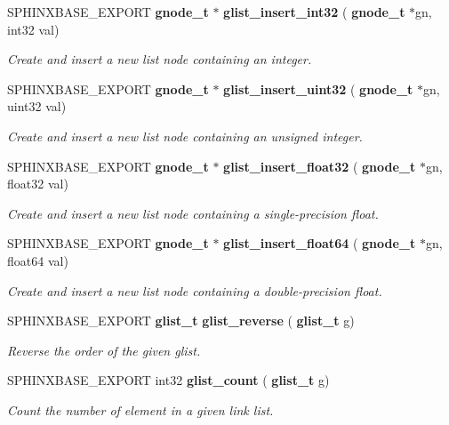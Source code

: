 \begin{DoxyCompactItemize}
S\+P\+H\+I\+N\+X\+B\+A\+S\+E\+\_\+\+E\+X\+P\+O\+RT \textbf{ gnode\+\_\+t} $\ast$ \textbf{ glist\+\_\+insert\+\_\+int32} (\textbf{ gnode\+\_\+t} $\ast$gn, int32 val)
\begin{DoxyCompactList}\small\item\em Create and insert a new list node containing an integer. \end{DoxyCompactList}\item 
S\+P\+H\+I\+N\+X\+B\+A\+S\+E\+\_\+\+E\+X\+P\+O\+RT \textbf{ gnode\+\_\+t} $\ast$ \textbf{ glist\+\_\+insert\+\_\+uint32} (\textbf{ gnode\+\_\+t} $\ast$gn, uint32 val)
\begin{DoxyCompactList}\small\item\em Create and insert a new list node containing an unsigned integer. \end{DoxyCompactList}\item 
S\+P\+H\+I\+N\+X\+B\+A\+S\+E\+\_\+\+E\+X\+P\+O\+RT \textbf{ gnode\+\_\+t} $\ast$ \textbf{ glist\+\_\+insert\+\_\+float32} (\textbf{ gnode\+\_\+t} $\ast$gn, float32 val)
\begin{DoxyCompactList}\small\item\em Create and insert a new list node containing a single-\/precision float. \end{DoxyCompactList}\item 
S\+P\+H\+I\+N\+X\+B\+A\+S\+E\+\_\+\+E\+X\+P\+O\+RT \textbf{ gnode\+\_\+t} $\ast$ \textbf{ glist\+\_\+insert\+\_\+float64} (\textbf{ gnode\+\_\+t} $\ast$gn, float64 val)
\begin{DoxyCompactList}\small\item\em Create and insert a new list node containing a double-\/precision float. \end{DoxyCompactList}\item 
S\+P\+H\+I\+N\+X\+B\+A\+S\+E\+\_\+\+E\+X\+P\+O\+RT \textbf{ glist\+\_\+t} \textbf{ glist\+\_\+reverse} (\textbf{ glist\+\_\+t} g)
\begin{DoxyCompactList}\small\item\em Reverse the order of the given glist. \end{DoxyCompactList}\item 
S\+P\+H\+I\+N\+X\+B\+A\+S\+E\+\_\+\+E\+X\+P\+O\+RT int32 \textbf{ glist\+\_\+count} (\textbf{ glist\+\_\+t} g)
\begin{DoxyCompactList}\small\item\em Count the number of element in a given link list. \end{DoxyCompactList}\item 

\end{DoxyCompactItemize}
